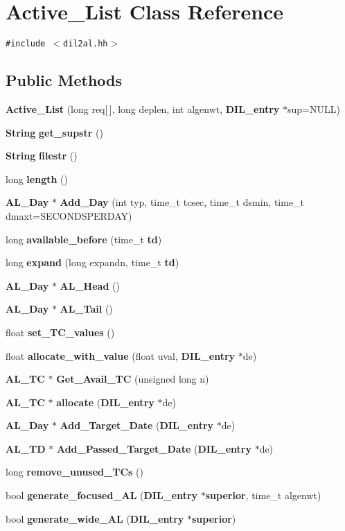 \section{Active\_\-List  Class Reference}
\label{classActive__List}
{\tt \#include $<$dil2al.hh$>$}

\subsection*{Public Methods}
\begin{CompactItemize}
\item 
{\bf Active\_\-List} (long req[$\,$], long deplen, int algenwt, {\bf DIL\_\-entry} $\ast$sup=NULL)
\item 
{\bf String} {\bf get\_\-supstr} ()
\item 
{\bf String} {\bf filestr} ()
\item 
long {\bf length} ()
\item 
{\bf AL\_\-Day} $\ast$ {\bf Add\_\-Day} (int typ, time\_\-t tcsec, time\_\-t dsmin, time\_\-t dmaxt=SECONDSPERDAY)
\item 
long {\bf available\_\-before} (time\_\-t {\bf td})
\item 
long {\bf expand} (long expandn, time\_\-t {\bf td})
\item 
{\bf AL\_\-Day} $\ast$ {\bf AL\_\-Head} ()
\item 
{\bf AL\_\-Day} $\ast$ {\bf AL\_\-Tail} ()
\item 
float {\bf set\_\-TC\_\-values} ()
\item 
float {\bf allocate\_\-with\_\-value} (float uval, {\bf DIL\_\-entry} $\ast$de)
\item 
{\bf AL\_\-TC} $\ast$ {\bf Get\_\-Avail\_\-TC} (unsigned long n)
\item 
{\bf AL\_\-TC} $\ast$ {\bf allocate} ({\bf DIL\_\-entry} $\ast$de)
\item 
{\bf AL\_\-Day} $\ast$ {\bf Add\_\-Target\_\-Date} ({\bf DIL\_\-entry} $\ast$de)
\item 
{\bf AL\_\-TD} $\ast$ {\bf Add\_\-Passed\_\-Target\_\-Date} ({\bf DIL\_\-entry} $\ast$de)
\item 
long {\bf remove\_\-unused\_\-TCs} ()
\item 
bool {\bf generate\_\-focused\_\-AL} ({\bf DIL\_\-entry} $\ast${\bf superior}, time\_\-t algenwt)
\item 
bool {\bf generate\_\-wide\_\-AL} ({\bf DIL\_\-entry} $\ast${\bf superior})
\end{CompactItemize}
